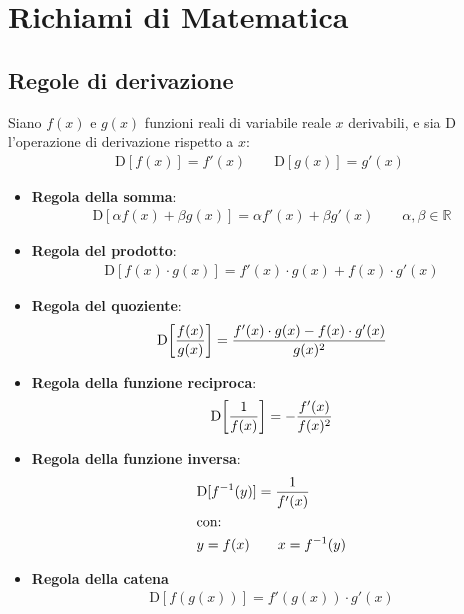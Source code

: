 
\chapter{Richiami di Matematica} %
\label{cha:matematica}

\section{Regole di derivazione} %
\label{sec:regole_di_derivazione}

Siano $f(x)$ e $g(x)$ funzioni reali di variabile reale $x$ derivabili, e sia $\mathrm{D}$ l'operazione di derivazione rispetto a $x$:
\begin{align*}
	\mathrm{D}[f(x)]=f'(x) \qquad \mathrm{D}[g(x)]=g'(x)
\end{align*}
\begin{itemize}
	\item \textbf{Regola della somma}:
	\begin{align*}
		\mathrm{D}[\alpha f(x)+ \beta g(x)] = \alpha f'(x) + \beta g'(x) \qquad \alpha, \beta \in \mathbb{R}
	\end{align*}
	\item \textbf{Regola del prodotto}:
	\begin{align*}
		\mathrm{D} [ {f(x) \cdot g(x)}] = f'(x) \cdot g(x) + f(x) \cdot g'(x) 
	\end{align*}
	\item \textbf{Regola del quoziente}:
	\begin{align*}
		\mathrm{D}\! \left[ {f(x) \over g(x)} \right] = { f'(x)  \cdot g(x) - f(x) \cdot g'(x) \over g(x)^2}
	\end{align*}
	\item \textbf{Regola della funzione reciproca}:
	\begin{align*}
		\mathrm{D}\! \left[ {1 \over f(x)} \right] = -{f'(x) \over f(x)^2} 
	\end{align*}
	\item \textbf{Regola della funzione inversa}:
	\begin{align*}
		&\mathrm{D}[f^{-1}(y)]  =  {1 \over f'(x)} \\
		&\text{con:} \\
		&y = {f(x)} \qquad x = {f^{-1}(y)}
	\end{align*}
	\item \textbf{Regola della catena}
	\begin{align*}
		\mathrm{D} \left[ f \left( g(x) \right) \right] = f' \left( g(x) \right) \cdot g'(x) 
	\end{align*}
\end{itemize}

